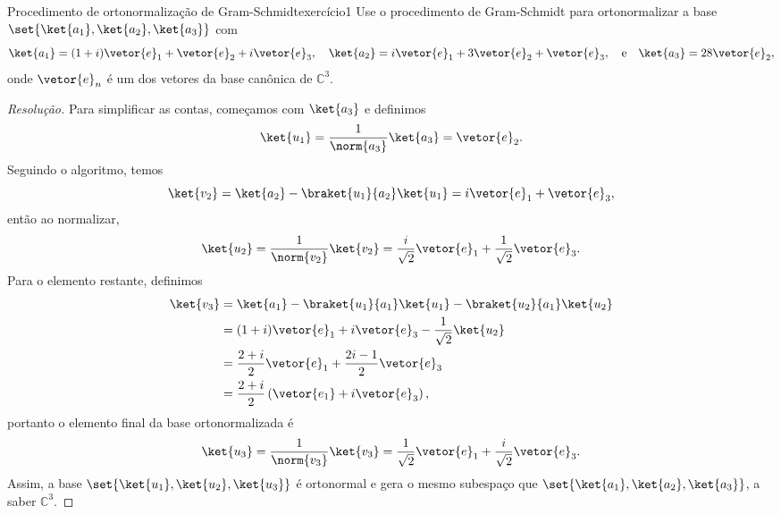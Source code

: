 \begin{exercício}{Procedimento de ortonormalização de Gram-Schmidt}{exercício1}
    Use o procedimento de Gram-Schmidt para ortonormalizar a base \(\set{\ket{a_1}, \ket{a_2}, \ket{a_3}}\) com
    \begin{equation*}
        \ket{a_1} = (1 + i)\vetor{e}_1 + \vetor{e}_2 + i \vetor{e}_3,\quad
        \ket{a_2} = i \vetor{e}_1 + 3 \vetor{e}_2 + \vetor{e}_3,\quad\text{e}\quad
        \ket{a_3} = 28 \vetor{e}_2,
    \end{equation*}
    onde \(\vetor{e}_n\) é um dos vetores da base canônica de \(\mathbb{C}^3\).
\end{exercício}
\begin{proof}[Resolução]
    Para simplificar as contas, começamos com \(\ket{a_3}\) e definimos
    \begin{equation*}
        \ket{u_1} = \frac{1}{\norm{a_3}} \ket{a_3} = \vetor{e}_2.
    \end{equation*}
    Seguindo o algoritmo, temos
    \begin{equation*}
        \ket{v_2} = \ket{a_2} - \braket{u_1}{a_2}\ket{u_1} = i \vetor{e}_1 + \vetor{e}_3,
    \end{equation*}
    então ao normalizar,
    \begin{equation*}
        \ket{u_2} = \frac{1}{\norm{v_2}}\ket{v_2} = \frac{i}{\sqrt{2}} \vetor{e}_1 + \frac1{\sqrt{2}}\vetor{e}_3.
    \end{equation*}
    Para o elemento restante, definimos
    \begin{align*}
        \ket{v_3} &= \ket{a_1} - \braket{u_1}{a_1}\ket{u_1} - \braket{u_2}{a_1}\ket{u_2}\\
                  &= (1 + i)\vetor{e}_1 + i \vetor{e}_3 - \frac{1}{\sqrt{2}}\ket{u_2}\\
                  &= \frac{2 + i}{2}\vetor{e}_1 + \frac{2i - 1}{2}\vetor{e}_3\\
                  &= \frac{2 + i}{2}\left(\vetor{e_1} + i \vetor{e}_3\right),
    \end{align*}
    portanto o elemento final da base ortonormalizada é
    \begin{equation*}
        \ket{u_3} = \frac{1}{\norm{v_3}} \ket{v_3} = \frac{1}{\sqrt{2}}\vetor{e}_1 + \frac{i}{\sqrt{2}} \vetor{e}_3.
    \end{equation*}
    Assim, a base \(\set{\ket{u_1}, \ket{u_2}, \ket{u_3}}\) é ortonormal e gera o mesmo subespaço que \(\set{\ket{a_1}, \ket{a_2}, \ket{a_3}}\), a saber \(\mathbb{C}^3\).
\end{proof}
